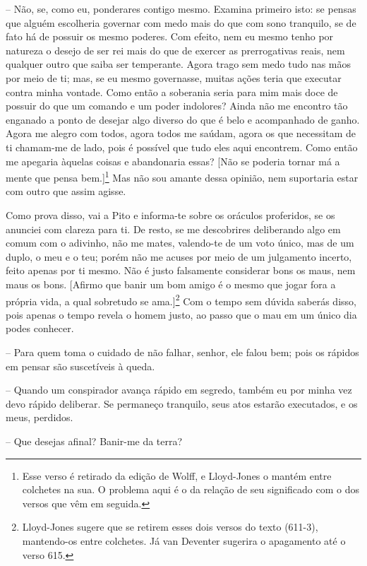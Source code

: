  --   Não, se, como eu, ponderares contigo mesmo. Examina primeiro isto: se
pensas que alguém escolheria governar com medo mais do que com sono
tranquilo, se de fato há de possuir os mesmo poderes. Com efeito, nem eu
mesmo tenho por natureza o desejo de ser rei mais do que de exercer as
prerrogativas reais, nem qualquer outro que  saiba ser temperante.
Agora trago sem medo tudo nas mãos por meio de ti; mas, se eu mesmo
governasse, muitas ações teria que executar contra minha vontade. Como
então a soberania seria para mim mais doce de possuir do que um comando
e um poder indolores? Ainda não me encontro tão enganado a ponto de
desejar algo diverso do que é belo e acompanhado de ganho. Agora me
alegro com todos, agora todos me saúdam, agora os que necessitam de ti
chamam-me de lado, pois é possível que tudo eles aqui encontrem. Como
então me apegaria àquelas coisas e abandonaria essas? {[}Não se 
poderia tornar má a mente que pensa bem.{]}\footnote{Esse verso é
  retirado da edição de Wolff, e Lloyd-Jones o mantém entre colchetes na
  sua. O problema aqui é o da relação de seu significado com o dos
  versos que vêm em seguida.} Mas não sou amante dessa opinião, nem
suportaria estar com outro que assim agisse.

Como prova disso, vai a Pito e informa-te sobre os oráculos proferidos,
se os anunciei com clareza para ti. De resto, se me descobrires
deliberando algo em comum com o adivinho, não me mates, valendo-te de um
voto único, mas de um duplo, o meu e o teu; porém não me acuses por meio
de um julgamento incerto, feito apenas por ti  mesmo. Não é justo
falsamente considerar bons os maus, nem maus os bons. {[}Afirmo que
banir um bom amigo é o mesmo que jogar fora a própria vida, a qual
sobretudo se ama.{]}\footnote{Lloyd-Jones sugere que se retirem esses
  dois versos do texto (611-3), mantendo-os entre colchetes. Já van
  Deventer sugerira o apagamento até o verso 615.} Com o tempo sem
dúvida saberás disso, pois apenas o tempo revela o homem justo, ao passo
que o mau em um único dia podes conhecer.

 --   Para quem toma o cuidado de não falhar, senhor, ele falou bem; pois os
rápidos em pensar são suscetíveis à queda.

 --   Quando um conspirador avança rápido em segredo, também eu por minha vez
 devo rápido deliberar. Se permaneço tranquilo, seus atos estarão
executados, e os meus, perdidos.

 --   Que desejas afinal? Banir-me da terra?

